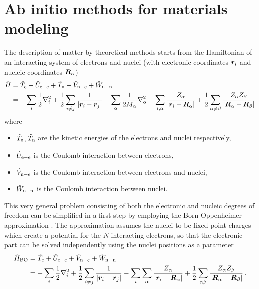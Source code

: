 \documentclass[main.tex]{subfiles}
\begin{document}
\chapter{Ab initio methods for materials modeling}\label{chap:ab-initio-modeling}


The description of matter by theoretical methods starts from the Hamiltonian of an interacting system of electrons and nuclei (with electronic coordinates \(\vb*{r}_i\) and nucleic coordinates \(\vb*{R}_{\alpha}\))
\begin{align}
    \hat{H} &= \hat{T}_{\mathrm{e}} + \hat{U}_{\mathrm{e-e}} + \hat{T}_{\mathrm{n}} + \hat{V}_{\mathrm{n-e}} + \hat{W}_{\mathrm{n-n}} \\
    &= - \sum_i \frac{1}{2} \nabla^2_i 
    + \frac{1}{2} \sum_{i \neq j} \frac{1}{\vert \vb*{r}_i - \vb*{r}_j \vert} 
    - \sum_{\alpha} \frac{1}{2 M_{\alpha}} \nabla^2_{\alpha}
    - \sum_{i, \alpha} \frac{Z_{\alpha}}{\vert \vb*{r}_i - \vb*{R}_{\alpha} \vert} 
    + \frac{1}{2} \sum_{\alpha \neq \beta} \frac{Z_{\alpha} Z_{\beta}}{\vert \vb*{R}_{\alpha} - \vb*{R}_{\beta} \vert}
\end{align}
where
\begin{itemize}
    \item \(\hat{T}_{\mathrm{e}}\,, \hat{T}_{\mathrm{n}}\) are the kinetic energies of the electrons and nuclei respectively,
    \item \(\hat{U}_{\mathrm{e-e}}\) is the Coulomb interaction between electrons,
    \item \(\hat{V}_{\mathrm{n-e}}\) is the Coulomb interaction between electrons and nuclei,
    \item \(\hat{W}_{\mathrm{n-n}}\) is the Coulomb interaction between nuclei.
\end{itemize}
This very general problem consisting of both the electronic and nucleic degrees of freedom can be simplified in a first step by employing the Born-Oppenheimer approximation \cite{born_zur_1927}.
The approximation assumes the nuclei to be fixed point charges which create a potential for the \(N\) interacting electrons, so that the electronic part can be solved independently using the nuclei positions as a parameter
\begin{align}
    \hat{H}_{\mathrm{BO}} &= \hat{T}_{\mathrm{e}} + \hat{U}_{\mathrm{e-e}} + \hat{V}_{\mathrm{n-e}} + \hat{W}_{\mathrm{n-n}} \\
    &= -\sum_i \frac{1}{2} \nabla^2_i 
    + \frac{1}{2} \sum_{i \neq j} \frac{1}{\vert \vb*{r}_i - \vb*{r}_j \vert} 
    - \sum_i \sum_{\alpha} \frac{Z_{\alpha}}{\vert \vb*{r}_i 
    - \vb*{R}_{\alpha} \vert} 
    + \frac{1}{2} \sum_{\alpha \beta} \frac{Z_{\alpha} Z_{\beta}}{\vert \vb*{R}_{\alpha} - \vb*{R}_{\beta} \vert}\,. \label{eq:bo_hamiltonian}
\end{align}
\end{document}
